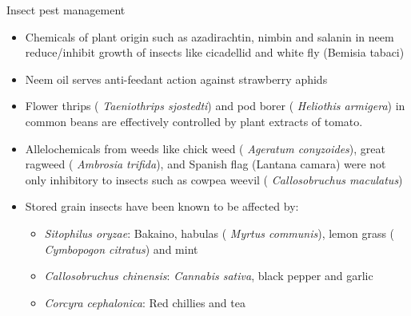\documentclass[11pt,dvipsnames,ignorenonframetext,aspectratio=169]{beamer}
\providecommand{\tightlist}{%
  \setlength{\itemsep}{0pt}\setlength{\parskip}{0pt}}
\begin{document}
\begin{frame}{Insect pest management}
\protect\hypertarget{insect-pest-management}{}
\begin{itemize}
\tightlist
\item
  Chemicals of plant origin such as azadirachtin, nimbin and salanin in
  neem reduce/inhibit growth of insects like cicadellid and white fly
  (Bemisia tabaci)
\item
  Neem oil serves anti-feedant action against strawberry aphids
\item
  Flower thrips ( \emph{Taeniothrips sjostedti}) and pod borer (
  \emph{Heliothis armigera}) in common beans are effectively controlled
  by plant extracts of tomato.
\item
  Allelochemicals from weeds like chick weed ( \emph{Ageratum
  conyzoides}), great ragweed ( \emph{Ambrosia trifida}), and Spanish
  flag (Lantana camara) were not only inhibitory to insects such as
  cowpea weevil ( \emph{Callosobruchus maculatus})
\item
  Stored grain insects have been known to be affected by:

  \begin{itemize}
  \tightlist
  \item
    \emph{Sitophilus oryzae}: Bakaino, habulas ( \emph{Myrtus
    communis}), lemon grass ( \emph{Cymbopogon citratus}) and mint
  \item
    \emph{Callosobruchus chinensis}: \emph{Cannabis sativa}, black
    pepper and garlic
  \item
    \emph{Corcyra cephalonica}: Red chillies and tea
  \end{itemize}
\end{itemize}
\end{frame}
\end{document}
